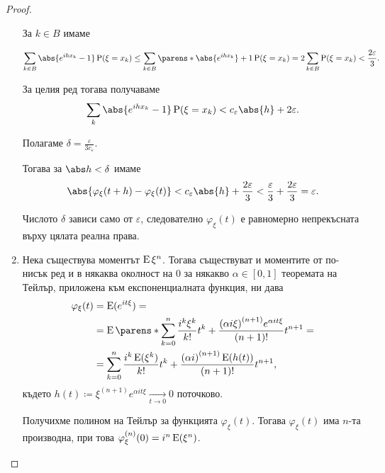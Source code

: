 \documentclass{../../common/topic}
\begin{document}
\begin{proof}
\begin{enumerate}
    За \( k \in B \) имаме

    \begin{equation*}
      \sum_{k \in B} \abs{e^{ih x_k} - 1} \Prob(\xi = x_k)
      \leq
      \sum_{k \in B} \parens*{ \abs{e^{ih x_k}} + 1 } \Prob(\xi = x_k)
      =
      2 \sum_{k \in B} \Prob(\xi = x_k)
      <
      \frac {2\varepsilon} 3.
    \end{equation*}

    За целия ред тогава получаваме
    \begin{equation*}
      \sum_k \abs{e^{ih x_k} - 1} \Prob(\xi = x_k)
      <
      c_\varepsilon \abs{h} + 2 \varepsilon.
    \end{equation*}

    Полагаме \( \delta = \frac \varepsilon {3 c_\varepsilon} \).

    Тогава за \( \abs h < \delta \) имаме
    \begin{equation*}
      \abs{\varphi_\xi(t + h) - \varphi_\xi(t)}
      <
      c_\varepsilon \abs{h} + \frac {2\varepsilon} 3
      <
      \frac {\varepsilon} 3 + \frac {2\varepsilon} 3
      =
      \varepsilon.
    \end{equation*}

    Числото \( \delta \) зависи само от \( \varepsilon \), следователно \( \varphi_\xi(t) \) е равномерно непрекъсната върху цялата реална права.

    \item Нека съществува моментът \( \operatorname{E} \xi^n \). Тогава съществуват и моментите от по-нисък ред и в някаква околност на \( 0 \) за някакво \( \alpha \in [0, 1] \) теоремата на Тейлър, приложена към експоненциалната функция, ни дава
    \begin{align*}
      \varphi_\xi(t)
      &=
      \Expect(e^{it\xi})
      = \\ &=
      \Expect\parens*{\sum_{k=0}^n \frac {i^k \xi^k} {k!} t^k + \frac {{(\alpha i \xi)}^{(n+1)} e^{\alpha it \xi}} {(n+1)!} t^{n+1} }
      = \\ &=
      \sum_{k=0}^n \frac {i^k \Expect(\xi^k)} {k!} t^k + \frac {{(\alpha i)}^{(n+1)} \Expect(h(t))} {(n+1)!} t^{n+1},
    \end{align*}
    където \( h(t) \coloneqq \xi^{(n+1)} e^{\alpha it \xi} \xrightarrow[t \to 0]{} 0 \) поточково.

    Получихме полином на Тейлър за функцията \( \varphi_\xi(t) \). Тогава \( \varphi_\xi(t) \) има \( n \)-та производна, при това \( \varphi^{(n)}_\xi(0) = i^n \operatorname{E}(\xi^n) \).


\end{enumerate}
\end{proof}
\end{document}
